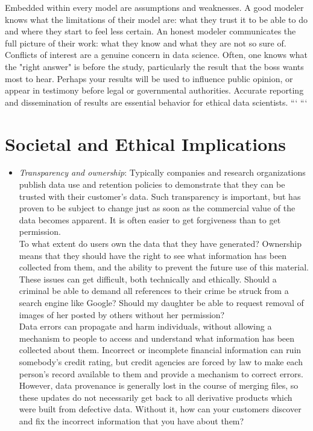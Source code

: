 \documentclass[10pt]{article}
\begin{document}
\begin{enumerate}
Embedded within every model are assumptions and weaknesses. A good modeler knows what the limitations of their model are: what they trust it to be able to do and where they start to feel less certain. An honest modeler communicates the full picture of their work: what they know and what they are not so sure of.\\
Conflicts of interest are a genuine concern in data science. Often, one knows what the "right answer" is before the study, particularly the result that the boss wants most to hear. Perhaps your results will be used to influence public opinion, or appear in testimony before legal or governmental authorities. Accurate reporting and dissemination of results are essential behavior for ethical data scientists.
```
```
\section{Societal and Ethical Implications}
\begin{itemize}
  \item \textit{Transparency and ownership}: Typically companies and research organizations publish data use and retention policies to demonstrate that they can be trusted with their customer's data. Such transparency is important, but has proven to be subject to change just as soon as the commercial value of the data becomes apparent. It is often easier to get forgiveness than to get permission.\\
To what extent do users own the data that they have generated? Ownership means that they should have the right to see what information has been collected from them, and the ability to prevent the future use of this material. These issues can get difficult, both technically and ethically. Should a criminal be able to demand all references to their crime be struck from a search engine like Google? Should my daughter be able to request removal of images of her posted by others without her permission?\\
Data errors can propagate and harm individuals, without allowing a mechanism to people to access and understand what information has been collected about them. Incorrect or incomplete financial information can ruin somebody's credit rating, but credit agencies are forced by law to make each person's record available to them and provide a mechanism to correct errors. However, data provenance is generally lost in the course of merging files, so these updates do not necessarily get back to all derivative products which were built from defective data. Without it, how can your customers discover and fix the incorrect information that you have about them?


\end{itemize}
\end{enumerate}
\end{document}
